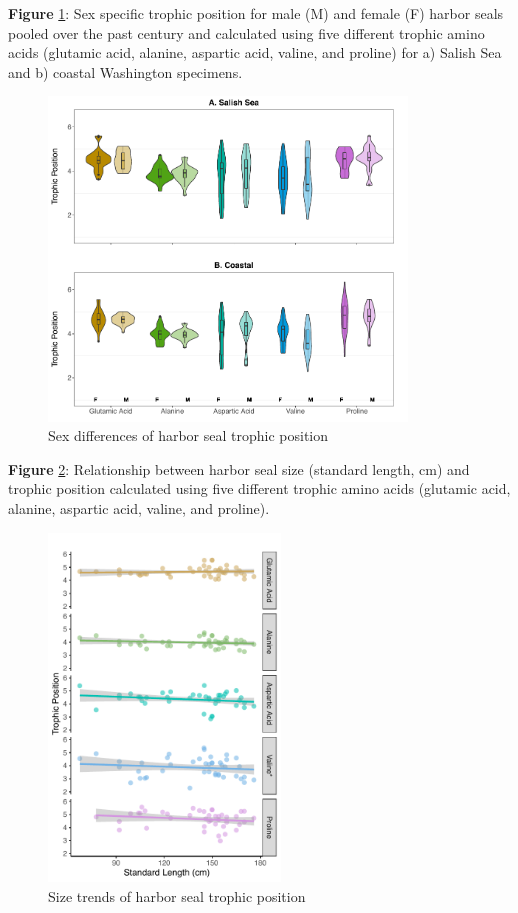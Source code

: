 \documentclass [11pt, proquest] {uwthesis}[2015/03/03]
\begin{document}
\textbf{Figure} \ref{fig:sexWA}: Sex specific trophic position for male
(M) and female (F) harbor seals pooled over the past century and
calculated using five different trophic amino acids (glutamic acid,
alanine, aspartic acid, valine, and proline) for a) Salish Sea and b)
coastal Washington specimens. \newline 
\begin{figure}[h]
\centering
  \includegraphics[width=0.85\textwidth]{figure/Ch3/FigureS5.pdf}
  \caption{Sex differences of harbor seal trophic position}
  \label{fig:sexWA}
\end{figure}
\clearpage

\textbf{Figure} \ref{fig:lengthWA}: Relationship between harbor seal
size (standard length, cm) and trophic position calculated using five
different trophic amino acids (glutamic acid, alanine, aspartic acid,
valine, and proline). \newline 
\begin{figure}[h]
\centering
  \includegraphics[width=0.55\textwidth]{figure/Ch3/FigureS4.pdf}
  \caption{Size trends of harbor seal trophic position}
  \label{fig:lengthWA}
\end{figure}
\clearpage
\end{document}
